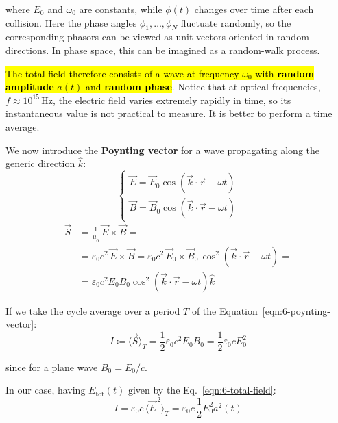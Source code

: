 where $E_0$ and $\omega_0$ are constants, while $\phi(t)$ changes over time after each collision. Here the phase angles $\phi_1,\ldots,\phi_N$ fluctuate randomly, so the corresponding phasors can be viewed as unit vectors oriented in random directions. In phase space, this can be imagined as a random-walk process.

\hl{The total field therefore consists of a wave at frequency $\omega_0$ with \textbf{random amplitude} $a(t)$ and \textbf{random phase}}.
Notice that at optical frequencies, $f\approx 10^{15}\,\text{Hz}$, the electric field varies extremely rapidly in time, so its instantaneous value is not practical to measure. It is better to perform a time average.

We now introduce the \textbf{Poynting vector} for a wave propagating along the generic direction $\hat{k}$:
\begin{equation}\label{eqn:6-generic-em-wave}
\begin{cases}
    \vec{E} = \vec{E}_0 \cos(\vec{k}\cdot\vec{r}-\omega t)\\[0.5ex]
    \vec{B} = \vec{B}_0 \cos(\vec{k}\cdot\vec{r}-\omega t)
\end{cases}
\end{equation}
\begin{equation}\label{eqn:6-poynting-vector}
\begin{split}
    \vec{S}&=\frac{1}{\mu_0}\,\vec{E}\times\vec{B}=\\[0.5ex]
    &=\varepsilon_0 c^2\,\vec{E}\times\vec{B}=
    \varepsilon_0 c^2\,\vec{E}_0\times\vec{B}_0\,
    \cos^2(\vec{k}\cdot\vec{r}-\omega t)=\\[0.5ex]
    &=\varepsilon_0 c^2 E_0 B_0 \cos^2(\vec{k}\cdot\vec{r}-\omega t) \hat{k}
\end{split}
\end{equation}

If we take the cycle average over a period $T$ of the Equation~\ref{eqn:6-poynting-vector}:
\begin{equation}\label{eqn:6-generic-em-wave-intensity}
    I\coloneqq\langle \vec{S}\rangle_T
    =\frac{1}{2}\varepsilon_0 c^2 E_0B_0
    =\frac{1}{2}\varepsilon_0 c E_0^2
\end{equation}

since for a plane wave $B_0=E_0/c$. 

In our case, having $E_\text{tot}(t)$ given by the Eq.~\ref{eqn:6-total-field}:
\begin{equation}\label{eqn:6-chaotic-light-intensity}
    I=\varepsilon_0 c\,\langle \vec{E}^{\,2}\rangle_T
    =\varepsilon_0 c\, \frac{1}{2}E_0^2 a^2(t)
\end{equation}

